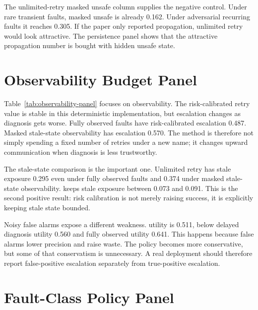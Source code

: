 The unlimited-retry masked unsafe column supplies the negative control. Under rare transient faults, masked unsafe is already 0.162. Under adversarial recurring faults it reaches 0.305. If the paper only reported propagation, unlimited retry would look attractive. The persistence panel shows that the attractive propagation number is bought with hidden unsafe state.

\section{Observability Budget Panel}

Table~\ref{tab:observability-panel} focuses on observability. The risk-calibrated retry value is stable in this deterministic implementation, but escalation changes as diagnosis gets worse. Fully observed faults have risk-calibrated escalation 0.487. Masked stale-state observability has escalation 0.570. The method is therefore not simply spending a fixed number of retries under a new name; it changes upward communication when diagnosis is less trustworthy.

\begin{table}[t]
\centering
\caption{Observability budget panel. \method escalates more under weak observability and keeps stale exposure far below unlimited retry.}
\label{tab:observability-panel}
\resizebox{\linewidth}{!}{}
\end{table}

The stale-state comparison is the important one. Unlimited retry has stale exposure 0.295 even under fully observed faults and 0.374 under masked stale-state observability. \method keeps stale exposure between 0.073 and 0.091. This is the second positive result: risk calibration is not merely raising success, it is explicitly keeping stale state bounded.

Noisy false alarms expose a different weakness. \method utility is 0.511, below delayed diagnosis utility 0.560 and fully observed utility 0.641. This happens because false alarms lower precision and raise waste. The policy becomes more conservative, but some of that conservatism is unnecessary. A real deployment should therefore report false-positive escalation separately from true-positive escalation.

\section{Fault-Class Policy Panel}

